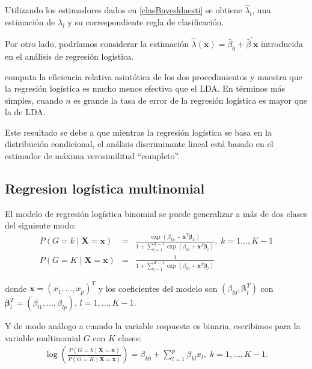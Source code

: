 \documentclass{report}
\begin{document}
Utilizando los estimadores dados en \eqref{clasBayesldaesti} se obtiene $\widehat{\lambda}_l$, una estimación de  $\lambda_l$ y su correspondiente regla de clasificación. 


Por otro lado, podríamos considerar la estimación $\widehat{\lambda}(\mathbf{x})=\bar{\beta}_0+\bar{\beta}^{\prime} \mathbf{x}$
introducida en el análisis de regresión logística. 




 \cite{efron1975} computa la eficiencia relativa asintótica de los dos procedimientos y muestra que la regresión logística es  mucho menos efectiva que el LDA. En términos más simples, cuando $n$ es grande la tasa de error de la regresión logística es mayor que la de LDA. 


Este resultado se debe a que mientras la regresión logística se basa en la distribución condicional, el análisis discriminante lineal está basado en el estimador de máxima verosimilitud ``completo''.




\subsection{Regresion logística multinomial}


 El modelo de regresión logística binomial se puede generalizar a más de dos clases del siguiente modo: 
\begin{eqnarray} 
	P(G=k \mid  \mathbf{X}=\mathbf{x})	&=&\frac{\exp \left(\beta_{k0}+\mathbf{x}^T\boldsymbol{\beta}_k \right)}{1+\sum_{l=1}^{K-1} \exp \left(\beta_{l 0}+\mathbf{x}^T\boldsymbol{\beta}_{l} \right)}, \; k=1\ldots, K-1\nonumber \\
	P(G=K \mid \mathbf{X}=\mathbf{x})&=& \frac{1}{1+\sum_{l=1}^{K-1} \exp \left(\beta_{l 0}+\mathbf{x}^T\boldsymbol{\beta}_{l} \right)}\label{logisticamult} 
\end{eqnarray}

donde  $\mathbf{x} = (x_1,\ldots, x_p)^T$ y los coeficientes del modelo son $(\beta_{l0}, \boldsymbol{\beta}_{l}^T)$ con $\boldsymbol{\beta}_l^T = (\beta_{l1}, \ldots, \beta_{lp})$, $l = 1, \ldots, K-1$.

 Y de modo análogo a cuando la variable respuesta es binaria, escribimos para la variable multinomial $G$ con $K$ clases:
\begin{eqnarray}\label{logisticamultequiv}
	\log\left(\frac{P(G=k \mid  \mathbf{X}=\mathbf{x})}{P(G=K \mid  \mathbf{X}=\mathbf{x})}\right)=\beta_{k0}+\sum_{l=1}^p\beta_{kl}x_l,\; k=1,\ldots, K-1.
\end{eqnarray}
\end{document}
